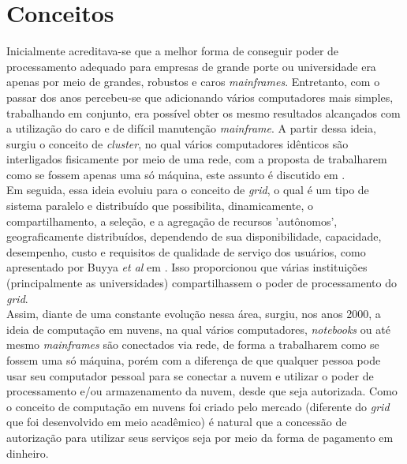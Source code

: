 \section{Conceitos}
Inicialmente acreditava-se que a melhor forma de conseguir poder de processamento adequado para empresas de grande porte ou universidade era apenas por meio de grandes, robustos e caros \textit{mainframes}. Entretanto, com o passar dos anos percebeu-se que adicionando vários computadores mais simples, trabalhando em conjunto, era possível obter os mesmo resultados alcançados com a utilização do caro e de difícil manutenção \textit{mainframe}.
A partir dessa ideia, surgiu o conceito de \textit{cluster}, no qual vários computadores idênticos são interligados fisicamente por meio de uma rede, com a proposta de trabalharem como se fossem apenas uma só máquina, este assunto é discutido em \cite{buyya1}. \\

Em seguida, essa ideia evoluiu para o conceito de \textit{grid}, o qual é um tipo de sistema paralelo e distribuído que possibilita, dinamicamente, o compartilhamento, a seleção, e a agregação de recursos 'autônomos', geograficamente distribuídos, dependendo de sua disponibilidade, capacidade, desempenho, custo e requisitos de qualidade de serviço dos usuários, como apresentado por Buyya \textit{et al} em \cite{buyya1}. Isso proporcionou que várias instituições (principalmente as universidades) compartilhassem o poder de processamento do \textit{grid}. \\

Assim, diante de uma constante evolução nessa área, surgiu, nos anos 2000, a ideia de computação em nuvens, na qual vários computadores, \textit{notebooks} ou até mesmo \textit{mainframes} são conectados via rede, de forma a trabalharem como se fossem uma só máquina, porém com a diferença de que qualquer pessoa pode usar seu computador pessoal para se conectar a nuvem e utilizar o poder de processamento e/ou armazenamento da nuvem, desde que seja autorizada. Como o conceito de computação em nuvens foi criado pelo mercado (diferente do \textit{grid} que foi desenvolvido em meio acadêmico) é natural que a concessão de autorização para utilizar seus serviços seja por meio da forma de pagamento em dinheiro. \\

